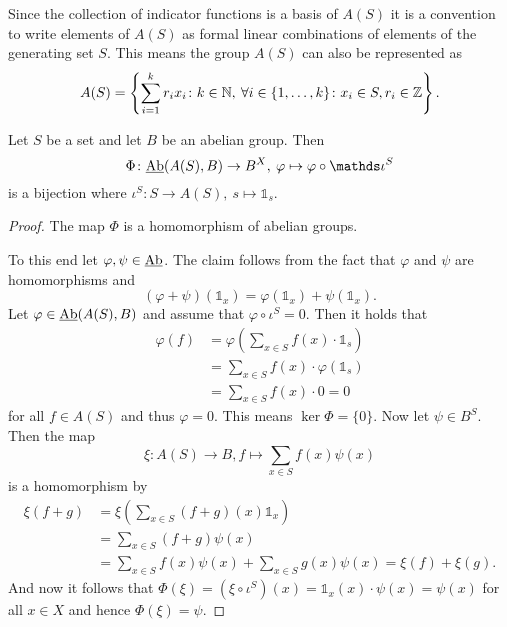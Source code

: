 Since the collection of indicator functions is a basis of $A(S)$ it is a convention to write elements of $A(S)$ as formal linear combinations of elements of the generating set $S$. This means the group $A(S)$ can also be represented as
\begin{equation*}
  A(S) = \left\{\sum\limits_{i=1}^k r_i x_i\colon k\in \mathbb{N}, \: \forall i \in \{1, \ldots, k\}\colon x_i \in S, r_i \in \mathbb{Z}\right\}.
\end{equation*}

\begin{thm}\label{thm:isoab}
  Let $S$ be a set and let $B$ be an abelian group. Then \[\Phi\colon \underline{\rm Ab}(A(S), B) \to B^X, \: \varphi \mapsto\varphi \circ \mathds\iota^S\] is a bijection where $\iota^S\colon S \to A(S), \: s \mapsto \mathds{1}_s$.
\end{thm}

\begin{proof}
  The map $\Phi$ is a homomorphism of abelian groups.

  To this end let $\varphi, \psi \in \underline{\rm Ab}$.
  The claim follows from the fact that $\varphi$ and $\psi$ are homomorphisms and \[(\varphi + \psi)(\mathds{1}_x) = \varphi(\mathds{1}_x) + \psi(\mathds{1}_x).\]
  Let $\varphi \in \underline{\rm Ab}(A(S), B)$ and assume that $\varphi \circ \iota^S = 0$. Then it holds that
  \begin{align*}
    \varphi(f) &= \varphi\left(\sum\limits_{x \in S}f(x) \cdot \mathds{1}_s\right) \\
    &= \sum\limits_{x \in S} f(x) \cdot \varphi(\mathds{1}_s) \\
    &= \sum\limits_{x \in S} f(x) \cdot 0 = 0
  \end{align*}
  for all $f \in A(S)$ and thus $\varphi = 0$. This means $\ker \Phi = \{0\}$.
  Now let $\psi \in B^S$. Then the map \[\xi\colon A(S) \to B, f \mapsto \sum\limits_{x \in S} f(x) \psi(x) \] is a homomorphism by
  \begin{align*}
    \xi(f + g) &= \xi\left(\sum\limits_{x \in S} (f+g)(x) \mathds{1}_x\right) \\
    &= \sum\limits_{x \in S}(f+g)\psi(x) \\
    &= \sum\limits_{x \in S} f(x)\psi(x) + \sum\limits_{x \in S}g(x)\psi(x) = \xi(f) + \xi(g).
  \end{align*}
  And now it follows that $\Phi(\xi) = (\xi \circ \iota^S)(x) = \mathds{1}_x(x) \cdot \psi(x) = \psi(x)$ for all $x \in X$ and hence $\Phi(\xi) = \psi$.
\end{proof}

